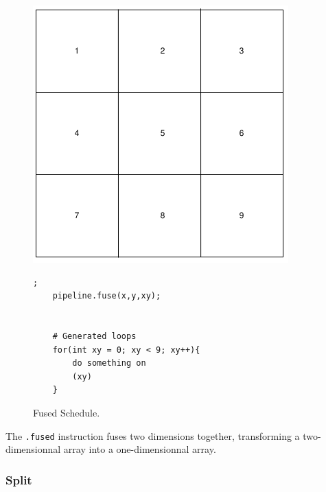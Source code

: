\begin{figure}[H]

		\begin{minipage}[c]{\EIW}
			\centering
		\includegraphics[width=\textwidth]{Images/BaseOrder.png}
		\end{minipage}
		\begin{minipage}[c]{\ECW}
			\centering
\begin{lstlisting}[label={code:reorder}];
    pipeline.fuse(x,y,xy);


	# Generated loops
	for(int xy = 0; xy < 9; xy++){
		do something on
		(xy)
	}
\end{lstlisting}
		\end{minipage}
		\caption{Fused Schedule.}
		\label{schedule:fuse}
\end{figure}

	The \verb|.fused| instruction fuses two dimensions together, transforming a two-dimensionnal array into a one-dimensionnal array. 


\subsubsection{Split}

